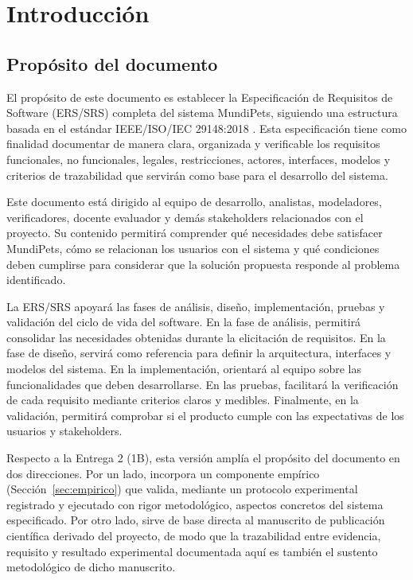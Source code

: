 \documentclass[journal,onecolumn]{IEEEtran}
\begin{document}
	\section{Introducción}
	
	\subsection{Propósito del documento}
	\label{sec:proposito}
	
	El propósito de este documento es establecer la Especificación de Requisitos de
	Software (ERS/SRS) completa del sistema MundiPets, siguiendo una estructura
	basada en el estándar IEEE/ISO/IEC 29148:2018 \cite{iso29148}. Esta
	especificación tiene como finalidad documentar de manera clara, organizada y
	verificable los requisitos funcionales, no funcionales, legales, restricciones,
	actores, interfaces, modelos y criterios de trazabilidad que servirán como base
	para el desarrollo del sistema.
	
	Este documento está dirigido al equipo de desarrollo, analistas, modeladores,
	verificadores, docente evaluador y demás stakeholders relacionados con el
	proyecto. Su contenido permitirá comprender qué necesidades debe satisfacer
	MundiPets, cómo se relacionan los usuarios con el sistema y qué condiciones
	deben cumplirse para considerar que la solución propuesta responde al problema
	identificado.
	
	La ERS/SRS apoyará las fases de análisis, diseño, implementación, pruebas y
	validación del ciclo de vida del software. En la fase de análisis, permitirá
	consolidar las necesidades obtenidas durante la elicitación de requisitos. En
	la fase de diseño, servirá como referencia para definir la arquitectura,
	interfaces y modelos del sistema. En la implementación, orientará al equipo
	sobre las funcionalidades que deben desarrollarse. En las pruebas, facilitará
	la verificación de cada requisito mediante criterios claros y medibles.
	Finalmente, en la validación, permitirá comprobar si el producto cumple con
	las expectativas de los usuarios y stakeholders.
	
	Respecto a la Entrega 2 (1B), esta versión amplía el propósito del documento en
	dos direcciones. Por un lado, incorpora un componente empírico
	(Sección~\ref{sec:empirico}) que valida, mediante un protocolo experimental
	registrado y ejecutado con rigor metodológico, aspectos concretos del sistema
	especificado. Por otro lado, sirve de base directa al manuscrito de
	publicación científica derivado del proyecto, de modo que la trazabilidad
	entre evidencia, requisito y resultado experimental documentada aquí es también
	el sustento metodológico de dicho manuscrito.
	
\end{document}
